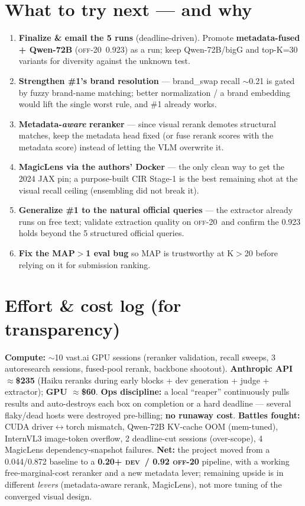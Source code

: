 \documentclass[10pt]{article}
\newcommand{\dev}{\textsc{dev}}
\newcommand{\off}{\textsc{off-20}}
\begin{document}
\section{What to try next --- and why}
\begin{enumerate}
\item \textbf{Finalize \& email the 5 runs} (deadline-driven). Promote \textbf{metadata-fused + Qwen-72B}
(\off\ 0.923) as a run; keep Qwen-72B/bigG and top-K=30 variants for diversity against the unknown test.
\item \textbf{Strengthen \#1's brand resolution} --- brand\_swap recall $\sim$0.21 is gated by fuzzy brand-name
matching; better normalization / a brand embedding would lift the single worst rule, and \#1 already works.
\item \textbf{Metadata-\emph{aware} reranker} --- since visual rerank demotes structural matches, keep the
metadata head fixed (or fuse rerank scores with the metadata score) instead of letting the VLM overwrite it.
\item \textbf{MagicLens via the authors' Docker} --- the only clean way to get the 2024 JAX pin; a purpose-built
CIR Stage-1 is the best remaining shot at the visual recall ceiling (ensembling did not break it).
\item \textbf{Generalize \#1 to the natural official queries} --- the extractor already runs on free text; validate
extraction quality on \off\ and confirm the 0.923 holds beyond the 5 structured official queries.
\item \textbf{Fix the MAP$>$1 eval bug} so MAP is trustworthy at K$>$20 before relying on it for submission ranking.
\end{enumerate}

\section{Effort \& cost log (for transparency)}
\textbf{Compute:} $\sim$10 vast.ai GPU sessions (reranker validation, recall sweeps, 3 autoresearch sessions,
fused-pool rerank, backbone shootout). \textbf{Anthropic API $\approx$\$235} (Haiku reranks during early
blocks + dev generation + judge + extractor); \textbf{GPU $\approx$\$60}. \textbf{Ops discipline:} a local
``reaper'' continuously pulls results and auto-destroys each box on completion or a hard deadline --- several
flaky/dead hosts were destroyed pre-billing; \textbf{no runaway cost}. \textbf{Battles fought:} CUDA
driver$\leftrightarrow$torch mismatch, Qwen-72B KV-cache OOM (mem-tuned), InternVL3 image-token overflow,
2 deadline-cut sessions (over-scope), 4 MagicLens dependency-snapshot failures. \textbf{Net:} the project moved
from a 0.044/0.872 baseline to a \textbf{0.20+ \dev\ / 0.92 \off} pipeline, with a working free-marginal-cost
reranker and a new metadata lever; remaining upside is in different \emph{levers} (metadata-aware rerank,
MagicLens), not more tuning of the converged visual design.
\end{document}
